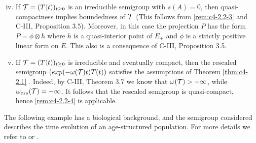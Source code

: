 \begin{enumerate}[(i)]
\setcounter{enumi}{3}
\item  \label{rem:c4-2.2-4}
If $\mathcal{T} = (T(t))_{t \geq 0}$ is an irreducible semigroup with $s(A) = 0$, then quasi-compactness implies boundedness of $\mathcal{T}$ (This follows from \ref{rem:c4-2.2-3} and C-III, Proposition 3.5).
Moreover, in this case the projection $P$ has the form $P = \phi \otimes h$ where $h$ 
is a quasi-interior point of $E_{+}$ and $\phi$ is a strictly positive linear form on $E$.
This also is a consequence of C-III, Proposition 3.5.
\item  \label{rem:c4-2.2-5}
If $\mathcal{T} = (T(t))_{t \geq 0}$ is irreducible and eventually compact, then the rescaled semigroup $(exp(-\omega(\mathcal{T})t)T(t))$ satisfies the assumptions of Theorem \ref{thm:c4-2.1} .
Indeed, by C-III, Theorem 3.7 we know that $\omega(\mathcal{T}) > -\infty$, while $\omega_{ess}(\mathcal{T}) = -\infty$.
It follows that the rescaled semigroup is quasi-compact, hence \ref{rem:c4-2.2-4} is applicable.
\end{enumerate}

The following example has a biological background, and the semigroup considered describes the time evolution of an age-structured population.
For more details we refer to \citet{greiner:1984a} or \citet{webb:1984}.

